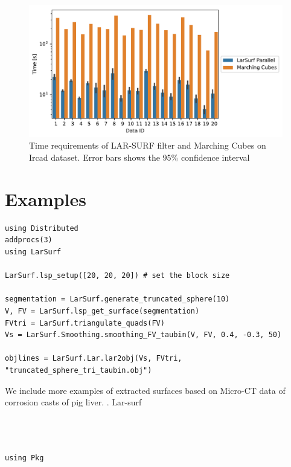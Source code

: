 \documentclass[11pt, oneside]{amsart}   	%
\begin{document}
\begin{figure}
\centering
\includegraphics[width=0.99\textwidth]{figs/ircad_comparison.pdf} 
\caption{Time requirements of LAR-SURF filter and Marching Cubes on Ircad dataset. Error bars shows the 95\% confidence interval}
\label{fig:ircad_comparison}
\end{figure}



%
\section{Examples}\label{sec:examples}

\begin{verbatim}
using Distributed
addprocs(3)
using LarSurf

LarSurf.lsp_setup([20, 20, 20]) # set the block size

segmentation = LarSurf.generate_truncated_sphere(10)
V, FV = LarSurf.lsp_get_surface(segmentation)
FVtri = LarSurf.triangulate_quads(FV)
Vs = LarSurf.Smoothing.smoothing_FV_taubin(V, FV, 0.4, -0.3, 50)

objlines = LarSurf.Lar.lar2obj(Vs, FVtri, "truncated_sphere_tri_taubin.obj")
\end{verbatim}

We include more examples of extracted surfaces based on Micro-CT data of corrosion casts of pig liver.
\cite{eberlova2017use}.
Lar-surf 


\begin{verbatim}



using Pkg
\end{verbatim}
\end{document}
